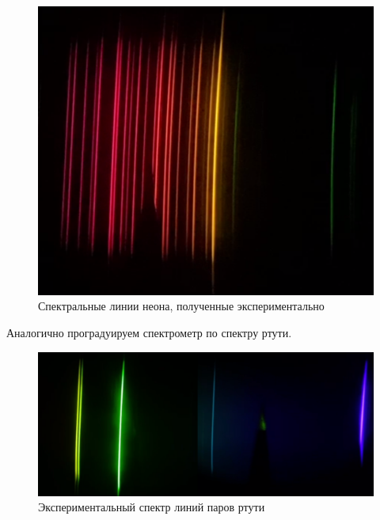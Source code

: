 \documentclass[a4paper,12pt]{article}
\begin{document}
\begin{figure}[h!]
	\centering
	\includegraphics[width=0.7\linewidth]{neon_spectre}
	\caption{Спектральные линии неона, полученные экспериментально}
\end{figure}

Аналогично проградуируем спектрометр по спектру ртути.

\begin{figure}[h!]
	\centering
	\includegraphics[width=\linewidth]{Hg_spectre}
	\caption{Экспериментальный спектр линий паров ртути}
\end{figure}	

\pagebreak
	
\end{document}
